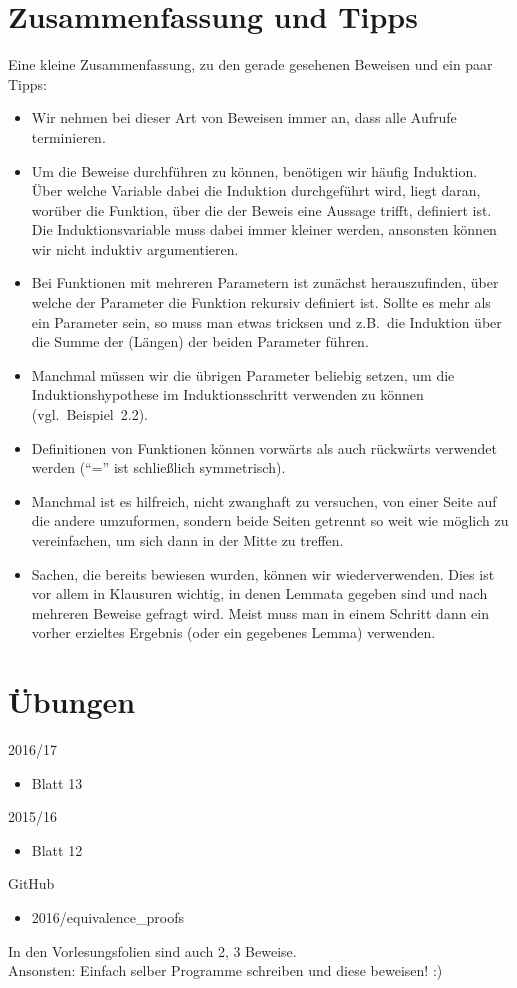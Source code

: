 \documentclass[hidelinks]{article}
\theoremstyle{plain}
\theoremstyle{definition}
\theoremstyle{rem}
\begin{document}
\begin{sloppypar}
\section{Zusammenfassung und Tipps}
Eine kleine Zusammenfassung, zu den gerade gesehenen Beweisen und ein paar Tipps:
\begin{itemize}
	\item Wir nehmen bei dieser Art von Beweisen immer an, dass alle Aufrufe terminieren.
	\item Um die Beweise durchführen zu können, benötigen wir häufig Induktion. Über welche Variable dabei die Induktion durchgeführt wird, liegt daran, worüber die Funktion, über die der Beweis eine Aussage trifft, definiert ist.
	Die Induktionsvariable muss dabei immer kleiner werden, ansonsten können wir nicht induktiv argumentieren.
	\item Bei Funktionen mit mehreren Parametern ist zunächst herauszufinden, über welche der Parameter die Funktion rekursiv definiert ist. Sollte es mehr als ein Parameter sein, so muss man etwas tricksen und z.B.\ die Induktion über die Summe der (Längen) der beiden Parameter führen. 
	\item Manchmal müssen wir die übrigen Parameter beliebig setzen, um die Induktionshypothese im Induktionsschritt verwenden zu können (vgl.\ Beispiel~2.2).
	\item Definitionen von Funktionen können vorwärts als auch rückwärts verwendet werden (``='' ist schließlich symmetrisch).
	\item Manchmal ist es hilfreich, nicht zwanghaft zu versuchen, von einer Seite auf die andere umzuformen, sondern beide Seiten getrennt so weit wie möglich zu vereinfachen, um sich dann in der Mitte zu treffen.
	\item Sachen, die bereits bewiesen wurden, können wir wiederverwenden. Dies ist vor allem in Klausuren wichtig, in denen Lemmata gegeben sind und nach mehreren Beweise gefragt wird. Meist muss man in einem Schritt dann ein vorher erzieltes Ergebnis (oder ein gegebenes Lemma) verwenden.
\end{itemize}

\section{Übungen}
2016/17
\begin{itemize}
\item Blatt 13
\end{itemize}
2015/16
\begin{itemize}
\item Blatt 12
\end{itemize}
GitHub
\begin{itemize}
\item 2016/equivalence\_proofs
\end{itemize}
In den Vorlesungsfolien sind auch 2, 3 Beweise.\\
Ansonsten: Einfach selber Programme schreiben und diese beweisen! :)
\end{sloppypar}
\end{document}
